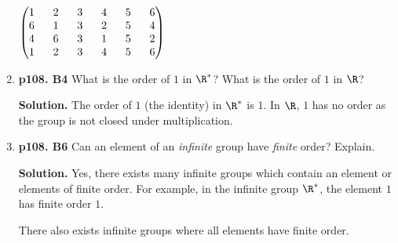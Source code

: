 \documentclass[11pt]{article}
\begin{document}
\begin{enumerate}
 	$\begin{pmatrix}
		1 \hspace{6mm} 2 \hspace{6mm} 3 \hspace{6mm} 4 \hspace{6mm} 5 \hspace{6mm} 6 \\
		6 \hspace{6mm} 1 \hspace{6mm} 3 \hspace{6mm} 2 \hspace{6mm} 5 \hspace{6mm} 4 \\
		4 \hspace{6mm} 6 \hspace{6mm} 3 \hspace{6mm} 1 \hspace{6mm} 5 \hspace{6mm} 2 \\
		1 \hspace{6mm} 2 \hspace{6mm} 3 \hspace{6mm} 4 \hspace{6mm} 5 \hspace{6mm} 6 \\
	\end{pmatrix}$

\item {\bfseries p108. B4} What is the order of $1$ in $\R^*$? What is the order of $1$ in $\R$?
  
 	{\bfseries Solution.} The order of $1$ (the identity) in $\R^*$ is $1$. In $\R$, $1$ has no order as the group is not closed under multiplication.

\item {\bfseries p108. B6} Can an element of an \textit{infinite} group have \textit{finite} order? Explain.
  
 	{\bfseries Solution.} Yes, there exists many infinite groups which contain an element or elements of finite order. For example, in the infinite group $\R^*$, the element $1$ has finite order $1$.
 	
 	There also exists infinite groups where all elements have finite order. 

\end{enumerate}
\end{document}

